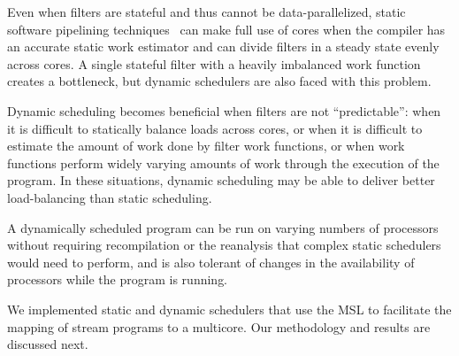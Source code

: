 Even when filters are stateful and thus cannot be data-parallelized,
static software pipelining techniques~\cite{asplos06} can make full
use of cores when the compiler has an accurate static work estimator
and can divide filters in a steady state evenly across
cores. A single stateful filter with a heavily imbalanced work
function creates a bottleneck, but dynamic schedulers are also faced
with this problem. 

Dynamic scheduling becomes beneficial when filters are not
``predictable'': when it is difficult to statically balance loads
across cores, or when it is difficult to estimate the amount of work
done by filter work functions, or when work functions perform widely
varying amounts of work through the execution of the program. In these
situations, dynamic scheduling may be able to deliver better
load-balancing than static scheduling.

A dynamically scheduled program can be run on varying numbers of
processors without requiring recompilation or the reanalysis that
complex static schedulers would need to perform, and is also tolerant
of changes in the availability of processors while the program is
running. 

We implemented static and dynamic schedulers that use the MSL to
facilitate the mapping of stream programs to a multicore. Our
methodology and results are discussed next.




